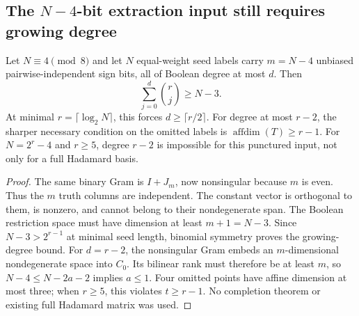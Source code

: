 \subsection{The $N-4$-bit extraction input still requires growing degree}
\begin{theorem}
\label{thm:nonlinear-punctured}
Let $N\equiv4\pmod8$ and let $N$ equal-weight seed labels carry $m=N-4$
unbiased pairwise-independent sign bits, all of Boolean degree at most
$d$. Then
\[
 \sum_{j=0}^d\binom rj\ge N-3.
\]
At minimal $r=\lceil\log_2N\rceil$, this forces
$d\ge\lceil r/2\rceil$. For degree at most $r-2$, the sharper necessary
condition on the omitted labels is $\operatorname{affdim}(T)\ge r-1$.
For $N=2^r-4$ and $r\ge5$, degree $r-2$ is impossible for this punctured
input, not only for a full Hadamard basis.
\end{theorem}
\begin{proof}
The same binary Gram is $I+J_m$, now nonsingular because $m$ is even.
Thus the $m$ truth columns are independent. The constant vector is
orthogonal to them, is nonzero, and cannot belong to their nondegenerate
span. The Boolean restriction space must have dimension at least
$m+1=N-3$. Since $N-3>2^{r-1}$ at minimal seed length, binomial symmetry
proves the growing-degree bound.
For $d=r-2$, the nonsingular Gram embeds an $m$-dimensional nondegenerate
space into $C_0$. Its bilinear rank must therefore be at least $m$,
so $N-4\le N-2a-2$ implies $a\le1$. Four omitted points have affine
dimension at most three; when $r\ge5$, this violates $t\ge r-1$.
No completion theorem or existing full Hadamard matrix was used.
\end{proof}

